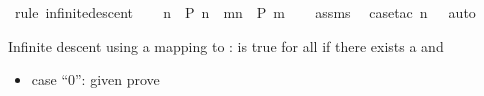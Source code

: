 \begin{isabellebody}
%
\isatagproof
{}\isamarkupfalse%
\ {\isacharparenleft}{\kern0pt}rule\ infinite{\isacharunderscore}{\kern0pt}descent{\isacharparenright}{\kern0pt}\isanewline
\ \ \isamarkupfalse%
\ {\isachardoublequoteopen}{\isasymAnd}n{\isachardot}{\kern0pt}\ {\isasymnot}\ P\ n\ {\isasymLongrightarrow}\ {\isasymexists}m{\isacharless}{\kern0pt}n{\isachardot}{\kern0pt}\ {\isasymnot}\ P\ m{\isachardoublequoteclose}\isanewline
\ \ \isamarkupfalse%
\ assms\ \isamarkupfalse%
\ {\isacharparenleft}{\kern0pt}case{\isacharunderscore}{\kern0pt}tac\ {\isachardoublequoteopen}n\ {\isachargreater}{\kern0pt}\ {}{\isachardoublequoteclose}{\isacharparenright}{\kern0pt}\ auto\isanewline
{}\isamarkupfalse%
%
\endisatagproof
{\isafoldproof}%
%
\isadelimproof
%
\endisadelimproof
%
\begin{isamarkuptext}%
Infinite descent using a mapping to :
 is true for all  if there exists a  and

%
\begin{itemize}%
\item case ``0'': given  prove 


\end{itemize}
\end{isamarkuptext}
\end{isabellebody}
